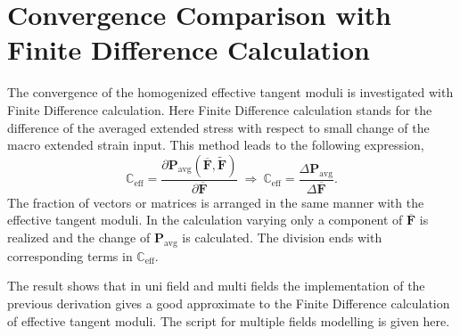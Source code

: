 \section{Convergence Comparison with Finite Difference Calculation}
The convergence of the homogenized effective tangent moduli is investigated with Finite Difference calculation. Here Finite Difference calculation stands for the difference of the averaged extended stress with respect to small change of the macro extended strain input. This method leads to the following expression, 
\begin{equation}
\mathbb{C}_{\text{eff}} = \dfrac{\partial \mathbf{P}_{\text{avg}} \left( \overbar{\mathbf{F}}, \widetilde{\mathbf{F}} \right)}{\partial \overbar{\mathbf{F}}} \ \Rightarrow \ \mathbb{C}_{\text{eff}} = \dfrac{\Delta \mathbf{P}_{\text{avg}}}{\Delta \overbar{\mathbf{F}}}.
\end{equation}
The fraction of vectors or matrices is arranged in the same manner with the effective tangent moduli. In the calculation varying only a component of $\overbar{\mathbf{F}}$ is realized and the change of $\mathbf{P}_{\text{avg}}$ is calculated. The division ends with corresponding terms in $\mathbb{C}_{\text{eff}}$.

The result shows that in uni field and multi fields the implementation of the previous derivation gives a good approximate to the Finite Difference calculation of effective tangent moduli. The script for multiple fields modelling is given here.

